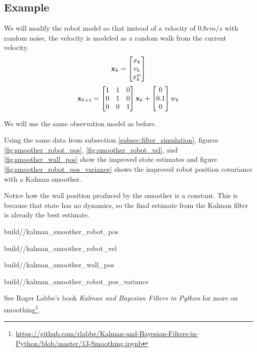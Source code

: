 \subsection{Example}

We will modify the robot model so that instead of a velocity of $0.8 cm/s$ with
random noise, the velocity is modeled as a random walk from the current
velocity.
\begin{equation}
  \mathbf{x}_k =
  \begin{bmatrix}
    x_k \\
    v_k \\
    x_k^w
  \end{bmatrix}
\end{equation}
\begin{equation}
  \mathbf{x}_{k+1} =
  \begin{bmatrix}
    1 & 1 & 0 \\
    0 & 1 & 0 \\
    0 & 0 & 1
  \end{bmatrix} \mathbf{x}_k +
  \begin{bmatrix}
    0 \\
    0.1 \\
    0
  \end{bmatrix} w_k
\end{equation}

We will use the same observation model as before.

Using the same data from subsection \ref{subsec:filter_simulation}, figures
\ref{fig:smoother_robot_pos}, \ref{fig:smoother_robot_vel}, and
\ref{fig:smoother_wall_pos} show the improved \gls{state} estimates and figure
\ref{fig:smoother_robot_pos_variance} shows the improved robot position
covariance with a Kalman smoother.

Notice how the wall position produced by the smoother is a constant. This is
because that \gls{state} has no dynamics, so the final estimate from the Kalman
filter is already the best estimate.
\begin{svg}{build/\chapterpath/kalman_smoother_robot_pos}
  \caption{Robot position with Kalman smoother}
  \label{fig:smoother_robot_pos}
\end{svg}
\begin{svg}{build/\chapterpath/kalman_smoother_robot_vel}
  \caption{Robot velocity with Kalman smoother}
  \label{fig:smoother_robot_vel}
\end{svg}
\begin{svg}{build/\chapterpath/kalman_smoother_wall_pos}
  \caption{Wall position with Kalman smoother}
  \label{fig:smoother_wall_pos}
\end{svg}
\begin{svg}{build/\chapterpath/kalman_smoother_robot_pos_variance}
  \caption{Robot position variance with Kalman smoother}
  \label{fig:smoother_robot_pos_variance}
\end{svg}

See Roger Labbe's book \textit{Kalman and Bayesian Filters in Python} for more
on
smoothing\footnote{\url{https://github.com/rlabbe/Kalman-and-Bayesian-Filters-in-Python/blob/master/13-Smoothing.ipynb}}.
